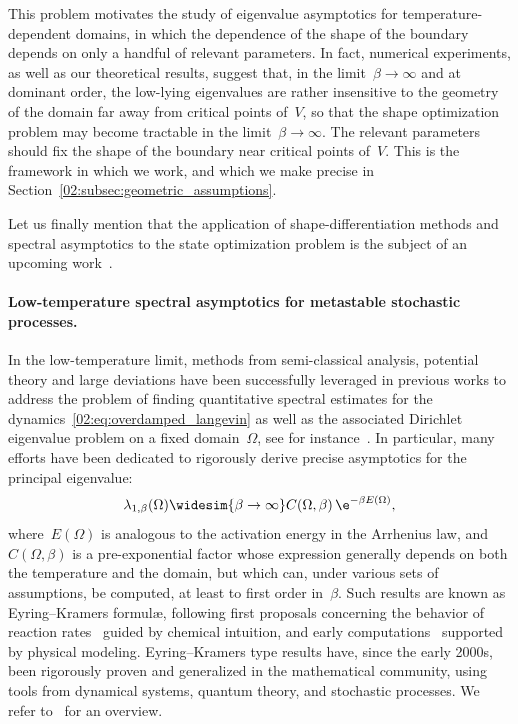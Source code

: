     This problem motivates the study of eigenvalue asymptotics for temperature-dependent domains, in which the dependence of the shape of the boundary depends on only a handful of relevant parameters.
    In fact, numerical experiments, as well as our theoretical results, suggest that, in the limit~$\beta\to\infty$ and at dominant order, the low-lying eigenvalues are rather insensitive to the geometry of the domain far away from critical points of~$V$, so that the shape optimization problem may become tractable in the limit~$\beta\to\infty$. The relevant parameters should fix the shape of the boundary near critical points of~$V$.
    This is the framework in which we work, and which we make precise in Section~\ref{02:subsec:geometric_assumptions}.
    
    Let us finally mention that the application of shape-differentiation methods and spectral asymptotics to the state optimization problem is the subject of an upcoming work~\cite{BLS25b}. 

    \paragraph{Low-temperature spectral asymptotics for metastable stochastic processes.}
    In the low-temperature limit, methods from semi-classical analysis, potential theory and large deviations have been successfully leveraged in previous works to address the problem of finding quantitative spectral estimates for the dynamics~\eqref{02:eq:overdamped_langevin} as well as the associated Dirichlet eigenvalue problem on a fixed domain~$\Omega$, see for instance~\cite{HKN04,BGK05,HN06,LN15,LLPN19,DGLLPN19,LPN21,LLPN22}.
    In particular, many efforts have been dedicated to rigorously derive precise asymptotics for the principal eigenvalue:
    \begin{equation}
        \label{02:eq:eyring_kramers_classic}
        \lambda_{1,\beta}(\Omega) \widesim{\beta\to\infty} C(\Omega,\beta)\,\e^{-\beta E(\Omega)},
    \end{equation}
    where~$E(\Omega)$ is analogous to the activation energy in the Arrhenius law, and~$C(\Omega,\beta)$ is a pre-exponential factor whose expression generally depends on both the temperature and the domain, but which can, under various sets of assumptions, be computed, at least to first order in~$\beta$.
    Such results are known as Eyring--Kramers formul\ae, following first proposals concerning the behavior of reaction rates~\cite{E35} guided by chemical intuition, and early computations~\cite{K40} supported by physical modeling. Eyring--Kramers type results have, since the early 2000s, been rigorously proven and generalized in the mathematical community, using tools from dynamical systems, quantum theory, and stochastic processes. We refer to~\cite{B13} for an overview.

